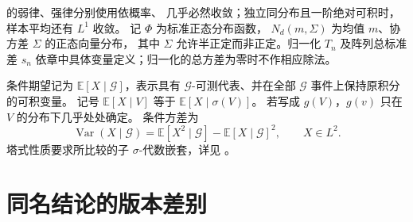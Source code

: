 的弱律、强律分别使用依概率、
几乎必然收敛；独立同分布且一阶绝对可积时，样本平均还有 $L^1$ 收敛。
记 $\Phi$ 为标准正态分布函数，
$N_d(m,\Sigma)$ 为均值 $m$、协方差 $\Sigma$ 的正态向量分布，
其中 $\Sigma$ 允许半正定而非正定。归一化 $T_n$ 及阵列总标准差 $s_n$
依章中具体变量定义；归一化的总方差为零时不作相应除法。

条件期望记为 $\mathbb E[X\mid\mathcal G]$，表示具有
$\mathcal G$-可测代表、并在全部 $\mathcal G$ 事件上保持原积分的可积变量。
记号 $\mathbb E[X\mid V]$ 等于 $\mathbb E[X\mid\sigma(V)]$。
若写成 $g(V)$，$g(v)$ 只在 $V$ 的分布下几乎处处确定。
条件方差为
\[
 \operatorname{Var}(X\mid\mathcal G)
 =\mathbb E[X^2\mid\mathcal G]-\mathbb E[X\mid\mathcal G]^2,
 \qquad X\in L^2.
\]
塔式性质要求所比较的子 $\sigma$-代数嵌套，详见
。

\section{同名结论的版本差别}

